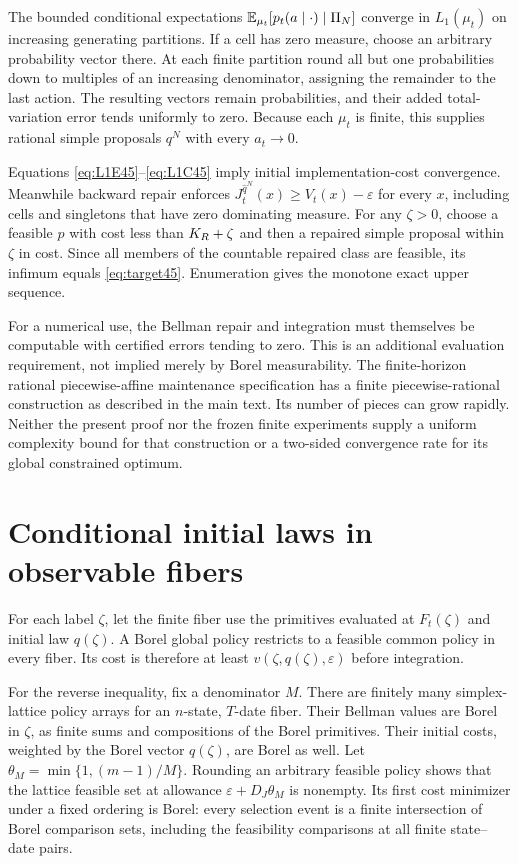 The bounded conditional expectations $\mathbb E_{\mu_t}[p_t(a\mid\cdot)\mid\Pi_N]$ converge in $L_1(\mu_t)$ on increasing generating partitions. If a cell has zero measure, choose an arbitrary probability vector there. At each finite partition round all but one probabilities down to multiples of an increasing denominator, assigning the remainder to the last action. The resulting vectors remain probabilities, and their added total-variation error tends uniformly to zero. Because each $\mu_t$ is finite, this supplies rational simple proposals $q^N$ with every $a_t\to0$.

Equations \eqref{eq:L1E45}--\eqref{eq:L1C45} imply initial implementation-cost convergence. Meanwhile backward repair enforces $J_t^{\widehat q^N}(x)\ge V_t(x)-\varepsilon$ for every $x$, including cells and singletons that have zero dominating measure. For any $\zeta>0$, choose a feasible $p$ with cost less than $K_R+\zeta$ and then a repaired simple proposal within $\zeta$ in cost. Since all members of the countable repaired class are feasible, its infimum equals \eqref{eq:target45}. Enumeration gives the monotone exact upper sequence.

For a numerical use, the Bellman repair and integration must themselves be computable with certified errors tending to zero. This is an additional evaluation requirement, not implied merely by Borel measurability. The finite-horizon rational piecewise-affine maintenance specification has a finite piecewise-rational construction as described in the main text. Its number of pieces can grow rapidly. Neither the present proof nor the frozen finite experiments supply a uniform complexity bound for that construction or a two-sided convergence rate for its global constrained optimum.

\section{Conditional initial laws in observable fibers}\label{app:fiber45}
For each label $\zeta$, let the finite fiber use the primitives evaluated at $F_t(\zeta)$ and initial law $q(\zeta)$. A Borel global policy restricts to a feasible common policy in every fiber. Its cost is therefore at least $v(\zeta,q(\zeta),\varepsilon)$ before integration.

For the reverse inequality, fix a denominator $M$. There are finitely many simplex-lattice policy arrays for an $n$-state, $T$-date fiber. Their Bellman values are Borel in $\zeta$, as finite sums and compositions of the Borel primitives. Their initial costs, weighted by the Borel vector $q(\zeta)$, are Borel as well. Let $\theta_M=\min\{1,(m-1)/M\}$. Rounding an arbitrary feasible policy shows that the lattice feasible set at allowance $\varepsilon+D_J\theta_M$ is nonempty. Its first cost minimizer under a fixed ordering is Borel: every selection event is a finite intersection of Borel comparison sets, including the feasibility comparisons at all finite state--date pairs.

